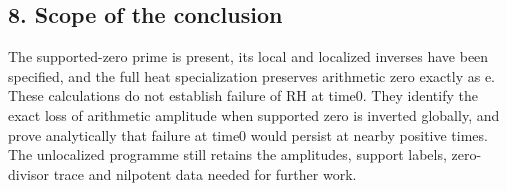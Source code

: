 \documentclass[
]{article}
\begin{document}
\subsection{8. Scope of the conclusion}\label{scope-of-the-conclusion}

The supported-zero prime is present, its local and localized inverses
have been specified, and the full heat specialization preserves
arithmetic zero exactly as e. These calculations do not establish
failure of RH at time0. They identify the exact loss of arithmetic
amplitude when supported zero is inverted globally, and prove
analytically that failure at time0 would persist at nearby positive
times. The unlocalized programme still retains the amplitudes, support
labels, zero-divisor trace and nilpotent data needed for further work.
\end{document}
